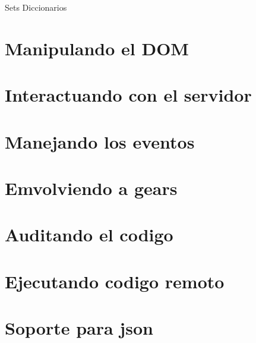 Sets
Diccionarios

%   
%   
%   
\section{Manipulando el DOM}

\section{Interactuando con el servidor}

\section{Manejando los eventos}

\section{Emvolviendo a gears}

\section{Auditando el codigo}

\section{Ejecutando codigo remoto}

\section{Soporte para json}
